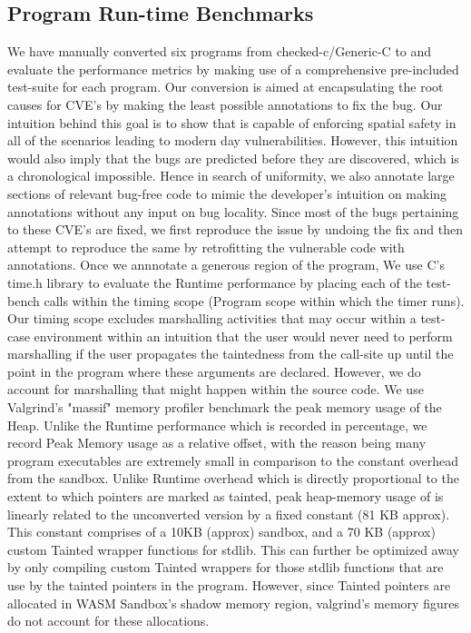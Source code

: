 \subsection{Program Run-time Benchmarks}
We have manually converted six programs from checked-c/Generic-C to \systemname and evaluate the performance metrics by making use of a comprehensive pre-included test-suite for each program.  Our conversion is aimed at encapsulating the root causes for CVE's by making the least possible \systemname annotations to fix the bug. Our intuition behind this goal is to show that \systemname is capable of enforcing spatial safety in all of the scenarios leading to modern day vulnerabilities. However, this intuition would also imply that the bugs are predicted before they are discovered, which is a chronological impossible. Hence in search of uniformity, we also annotate large sections of relevant bug-free code to mimic the developer's intuition on making \systemname annotations without any input on bug locality. Since most of the bugs pertaining to these CVE's are fixed, we first reproduce the issue by undoing the fix and then attempt to reproduce the same by retrofitting the vulnerable code with \systemname annotations. Once we annnotate a generous region of the program, We use C's \<time.h\> library to evaluate the Runtime performance by placing each of the test-bench calls within the timing scope (Program scope within which the timer runs). Our timing scope excludes marshalling activities that may occur within a test-case environment within an intuition that the user would never need to perform marshalling if the user propagates the tainted\-ness from the call-site up until the point in the program where these arguments are declared. However, we do account for marshalling that might happen within the source code. We use Valgrind's "massif" memory profiler benchmark the peak memory usage of the Heap. Unlike the Runtime performance which is recorded in percentage, we record Peak Memory usage as a relative offset, with the reason being many program executables are extremely small in comparison to the constant overhead from the sandbox. Unlike Runtime overhead which is directly proportional to the extent to which pointers are marked as tainted, peak heap-memory usage of \systemname is linearly related to the unconverted version by a fixed constant (81 KB approx). This constant comprises of a 10KB (approx) sandbox, and a 70 KB (approx) custom Tainted wrapper functions for stdlib. This can further be optimized away by only compiling custom Tainted wrappers for those stdlib functions that are use by the tainted pointers in the program. However, since Tainted pointers are allocated in WASM Sandbox's shadow memory region, valgrind's memory figures do not account for these allocations. 


